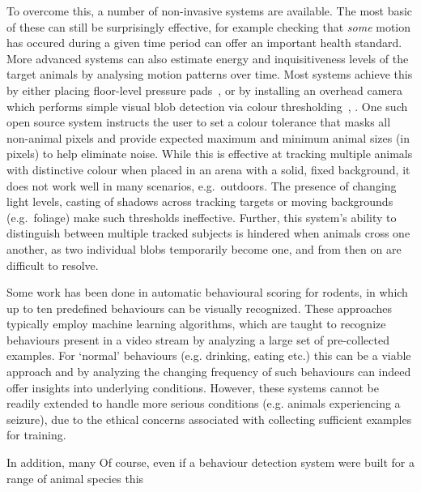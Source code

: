 To overcome this, a number of non-invasive systems are available. The most basic of these can still be surprisingly effective, for example checking that \emph{some} motion has occured during a given time period can offer an important health standard. More advanced systems can also estimate energy and inquisitiveness levels of the target animals by analysing motion patterns over time. Most systems achieve this by either placing floor-level pressure pads~\cite{zammit2010reliability}, or by installing an overhead camera which performs simple visual blob detection via colour thresholding~\cite{tort2006simple}, \cite{rodriquez2017toxtrac}. One such open source system instructs the user to set a colour tolerance that masks all non-animal pixels and provide expected maximum and minimum animal sizes (in pixels) to help eliminate noise. While this is effective at tracking multiple animals with distinctive colour when placed in an arena with a solid, fixed background, it does not work well in many scenarios, e.g.\ outdoors. The presence of changing light levels, casting of shadows across tracking targets or moving backgrounds (e.g.\ foliage) make such thresholds ineffective. Further, this system's ability to distinguish between multiple tracked subjects is hindered when animals cross one another, as two individual blobs temporarily become one, and from then on are difficult to resolve.

Some work has been done in automatic behavioural scoring for rodents, in which up to ten predefined behaviours can be visually recognized. These approaches typically employ machine learning algorithms, which are taught to recognize behaviours present in a video stream by analyzing a large set of pre-collected examples. For `normal' behaviours (e.g. drinking, eating etc.) this can be a viable approach and by analyzing the changing frequency of such behaviours can indeed offer insights into underlying conditions. However, these systems cannot be readily extended to handle more serious conditions (e.g. animals experiencing a seizure), due to the ethical concerns associated with collecting sufficient examples for training. 

In addition, many 
Of course, even if a behaviour detection system were built for a range of animal species this 


